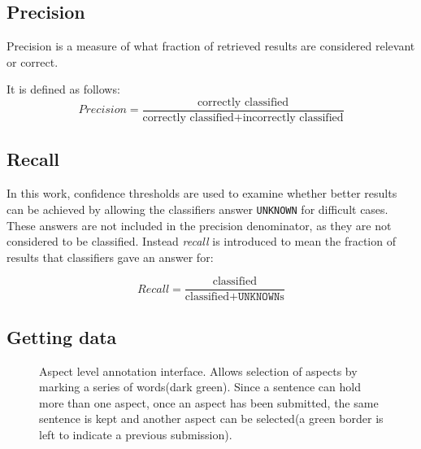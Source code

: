 \documentclass[a4paper,11pt]{kth-mag}
\begin{document}
\subsection{Precision}
Precision is a measure of what fraction of retrieved results are considered relevant or correct.

It is defined as follows:
\begin{equation} \label{eq:precision}
Precision = \frac{\text {correctly classified}}{\text{correctly classified} + \text{incorrectly classified}}
\end{equation}

\subsection{Recall}
In this work, confidence thresholds are used to examine whether better results can be achieved by
allowing the classifiers answer \texttt{UNKNOWN} for difficult cases. These answers are not included in
the precision denominator, as they are not considered to be classified.
Instead \emph{recall} is introduced to mean the fraction of results that classifiers gave an answer for:

\begin{equation} \label{eq:recall}
Recall = \frac{\text {classified}}{\text{classified} + \texttt{UNKNOWN}\text{s}}
\end{equation}


\newpage
\subsection{Getting data}
\label{subsec:getting_data}

\begin{figure}[h]
  \centering
  \caption{Aspect level annotation interface. Allows selection of aspects by marking a series of words(dark green). Since a sentence can hold more than one aspect, once an aspect has been submitted, the same sentence is kept and another aspect can be selected(a green border is left to indicate a previous submission).}
  \label{fig:annotate_aspect}
\end{figure}
\end{document}

